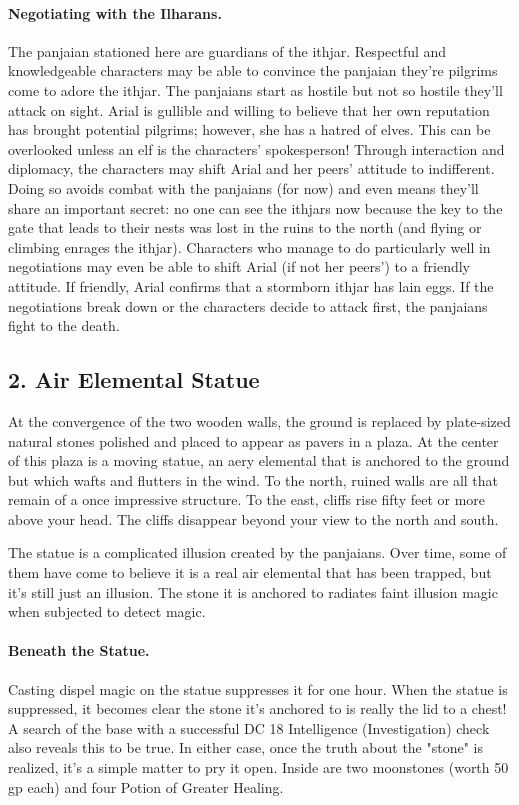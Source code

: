 \documentclass[10pt,a4paper,twoside,twocolumn,openany,bg=print,nodeprecatedcode]{dndbook}
\begin{document}
\paragraph{Negotiating with the Ilharans.}
The panjaian stationed here are guardians of the ithjar. Respectful and knowledgeable characters may be able to convince the panjaian they're pilgrims come to adore the ithjar. The panjaians start as hostile but not so hostile they'll attack on sight. Arial is gullible and willing to believe that her own reputation has brought potential pilgrims; however, she has a hatred of elves. This can be overlooked unless an elf is the characters' spokesperson!
Through interaction and diplomacy, the characters may shift Arial and her peers' attitude to indifferent. Doing so avoids combat with the panjaians (for now) and even means they'll share an important secret: no one can see the ithjars now because the key to the gate that leads to their nests was lost in the ruins to the north (and flying or climbing enrages the ithjar).
Characters who manage to do particularly well in negotiations may even be able to shift Arial (if not her peers') to a friendly attitude. If friendly, Arial confirms that a stormborn ithjar has lain eggs. If the negotiations break down or the characters decide to attack first, the panjaians fight to the death.
\subsection{2. Air Elemental Statue}
\begin{DndReadAloud}{}
At the convergence of the two wooden walls, the ground is replaced by plate-sized natural stones polished and placed to appear as pavers in a plaza. At the center of this plaza is a moving statue, an aery elemental that is anchored to the ground but which wafts and flutters in the wind. To the north, ruined walls are all that remain of a once impressive structure. To the east, cliffs rise fifty feet or more above your head. The cliffs disappear beyond your view to the north and south.
\end{DndReadAloud}

The statue is a complicated illusion created by the panjaians. Over time, some of them have come to believe it is a real air elemental that has been trapped, but it's still just an illusion. The stone it is anchored to radiates faint illusion magic when subjected to detect magic.
\paragraph{Beneath the Statue.}
Casting dispel magic on the statue suppresses it for one hour. When the statue is suppressed, it becomes clear the stone it's anchored to is really the lid to a chest! A search of the base with a successful DC 18 Intelligence (Investigation) check also reveals this to be true. In either case, once the truth about the "stone" is realized, it's a simple matter to pry it open. Inside are two moonstones (worth 50 gp each) and four Potion of Greater Healing.
\end{document}

